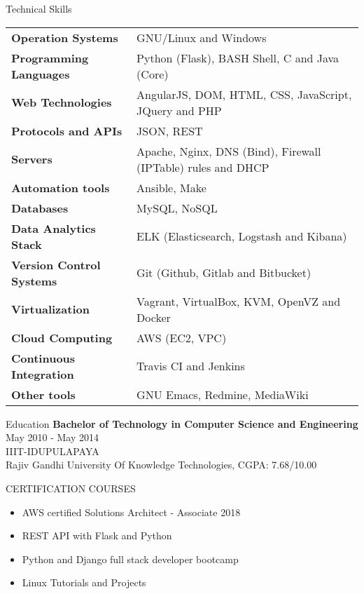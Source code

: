 \documentclass{resume} %
\begin{document}
\begin{rSection}
  {Technical Skills}

  \begin{tabular}{ @{} >{\bfseries}l @{\hspace{2ex}} l }
    Operation Systems & GNU/Linux and Windows \\
    Programming Languages & Python (Flask), BASH Shell, C and Java (Core)
    \\ Web Technologies & AngularJS, DOM, HTML, CSS,
    JavaScript, JQuery and PHP\\ Protocols and
    APIs & JSON, REST \\ Servers
    & Apache, Nginx, DNS (Bind), Firewall (IPTable) rules
    and DHCP \\ Automation tools & Ansible, Make
    \\ Databases & MySQL, NoSQL \\ Data Analytics Stack &
    ELK (Elasticsearch, Logstash and Kibana) \\
    Version Control Systems & Git (Github, Gitlab and
    Bitbucket) \\ Virtualization & Vagrant, VirtualBox, KVM,
    OpenVZ and Docker \\ Cloud Computing & AWS (EC2, VPC)
    \\ Continuous Integration & Travis CI and Jenkins \\ Other
    tools & GNU Emacs, Redmine, MediaWiki
    
  \end{tabular}

\end{rSection}



\begin{rSection}{Education}
  {\bf Bachelor of Technology in Computer Science and Engineering} \hfill {May 2010 - May 2014}
  \\ 
  IIIT-IDUPULAPAYA
  \\
  Rajiv Gandhi University Of Knowledge Technologies,  CGPA: 7.68/10.00  
  

\end{rSection}

\begin{rSection}{CERTIFICATION COURSES}
  \begin{itemize}
  \item AWS certified Solutions Architect - Associate 2018 
  \item REST API with Flask and Python
  \item Python and Django full stack developer bootcamp
  \item Linux Tutorials and Projects
    
  \end{itemize}

\end{rSection}
\end{document}
